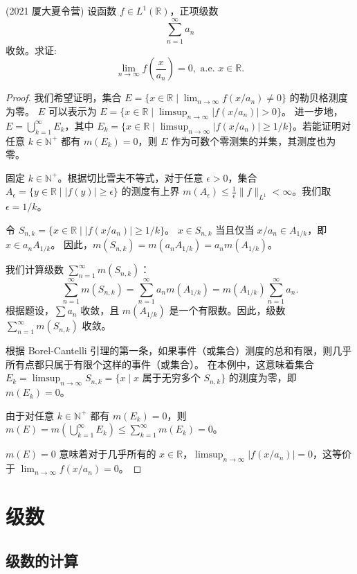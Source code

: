 \documentclass[lang=cn,10pt,thmcnt=section]{elegantbook}
\begin{document}
\begin{example}
    (2021 厦大夏令营) 设函数 \( f \in L^1(\mathbb{R}) \)，正项级数 
\[
\sum_{n=1}^\infty a_n
\] 
收敛。求证: 
\[
\lim_{n \to \infty} f\left(\frac{x}{a_n}\right) = 0, \text{ a.e. } x \in \mathbb{R}.
\]
\end{example}
\begin{proof}
    我们希望证明，集合 $E = \{x \in \mathbb{R} \mid \lim_{n\to\infty} f(x/a_n) \neq 0\}$ 的勒贝格测度为零。
    $E$ 可以表示为 $E = \{x \in \mathbb{R} \mid \limsup_{n\to\infty} |f(x/a_n)| > 0\}$。
    进一步地，$E = \bigcup_{k=1}^\infty E_k$，其中 $E_k = \{x \in \mathbb{R} \mid \limsup_{n\to\infty} |f(x/a_n)| \ge 1/k\}$。若能证明对任意 $k \in \mathbb{N}^+$ 都有 $m(E_k)=0$，则 $E$ 作为可数个零测集的并集，其测度也为零。
    
    固定 $k \in \mathbb{N}^+$。根据切比雪夫不等式，对于任意 $\epsilon > 0$，集合 $A_\epsilon = \{y \in \mathbb{R} \mid |f(y)| \ge \epsilon\}$ 的测度有上界 $m(A_\epsilon) \le \frac{1}{\epsilon} \|f\|_{L^1} < \infty$。我们取 $\epsilon = 1/k$。
    
    令 $S_{n,k} = \{ x \in \mathbb{R} \mid |f(x/a_n)| \ge 1/k \}$。
    $x \in S_{n,k}$ 当且仅当 $x/a_n \in A_{1/k}$，即 $x \in a_n A_{1/k}$。
    因此，$m(S_{n,k}) = m(a_n A_{1/k}) = a_n m(A_{1/k})$。
    
    我们计算级数 $\sum_{n=1}^\infty m(S_{n,k})$：
    \[
    \sum_{n=1}^\infty m(S_{n,k}) = \sum_{n=1}^\infty a_n m(A_{1/k}) = m(A_{1/k}) \sum_{n=1}^\infty a_n.
    \]
    根据题设，$\sum a_n$ 收敛，且 $m(A_{1/k})$ 是一个有限数。因此，级数 $\sum_{n=1}^\infty m(S_{n,k})$ 收敛。
    
    根据 Borel-Cantelli 引理的第一条，如果事件（或集合）测度的总和有限，则几乎所有点都只属于有限个这样的事件（或集合）。
    在本例中，这意味着集合 $E_k = \limsup_{n\to\infty} S_{n,k} = \{x \mid x \text{ 属于无穷多个 } S_{n,k}\}$ 的测度为零，即 $m(E_k)=0$。
    
    由于对任意 $k \in \mathbb{N}^+$ 都有 $m(E_k)=0$，则 $m(E) = m(\bigcup_{k=1}^\infty E_k) \le \sum_{k=1}^\infty m(E_k) = 0$。
    
    $m(E)=0$ 意味着对于几乎所有的 $x \in \mathbb{R}$，$\limsup_{n\to\infty} |f(x/a_n)| = 0$，这等价于 $\lim_{n\to\infty} f(x/a_n) = 0$。
\end{proof}
\chapter{级数}
\section{级数的计算}
\end{document}
